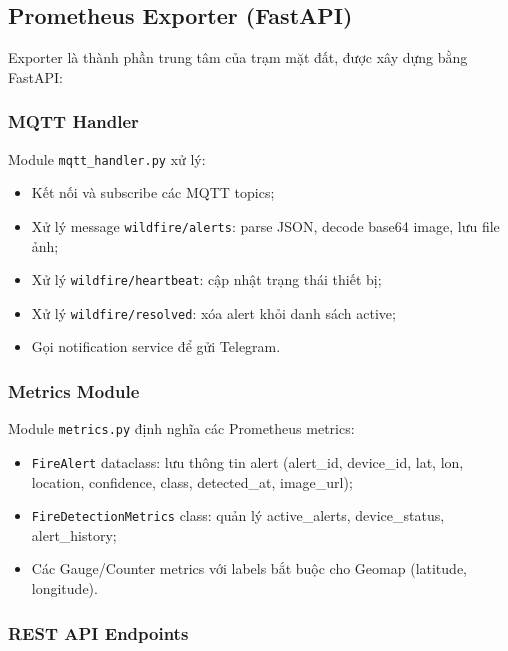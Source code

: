 \documentclass[12pt,a4paper]{report}
\begin{document}
\subsection{Prometheus Exporter (FastAPI)}

Exporter là thành phần trung tâm của trạm mặt đất, được xây dựng bằng FastAPI:

\subsubsection{MQTT Handler}

Module \texttt{mqtt\_handler.py} xử lý:
\begin{itemize}
  \item Kết nối và subscribe các MQTT topics;
  \item Xử lý message \texttt{wildfire/alerts}: parse JSON, decode base64 image, lưu file ảnh;
  \item Xử lý \texttt{wildfire/heartbeat}: cập nhật trạng thái thiết bị;
  \item Xử lý \texttt{wildfire/resolved}: xóa alert khỏi danh sách active;
  \item Gọi notification service để gửi Telegram.
\end{itemize}

\subsubsection{Metrics Module}

Module \texttt{metrics.py} định nghĩa các Prometheus metrics:
\begin{itemize}
  \item \texttt{FireAlert} dataclass: lưu thông tin alert (alert\_id, device\_id, lat, lon, location, confidence, class, detected\_at, image\_url);
  \item \texttt{FireDetectionMetrics} class: quản lý active\_alerts, device\_status, alert\_history;
  \item Các Gauge/Counter metrics với labels bắt buộc cho Geomap (latitude, longitude).
\end{itemize}

\subsubsection{REST API Endpoints}
\end{document}
